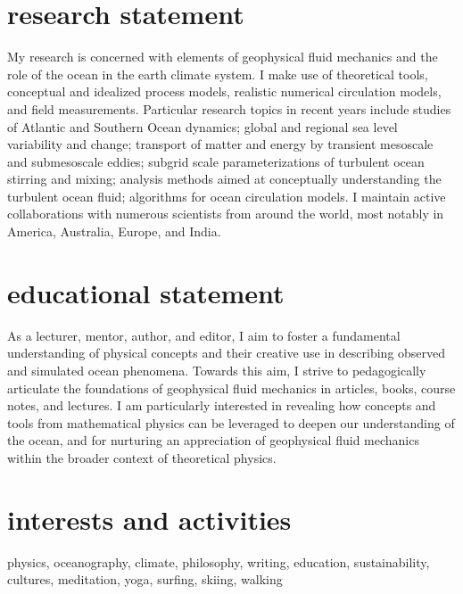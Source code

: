 \documentclass{article}
\begin{document}
\section*{\sc \color{Maroon}  research statement}
\vspace{-.3cm}
My research is concerned with elements of geophysical fluid mechanics and the role of the ocean in the earth climate system. I make use of theoretical tools, conceptual and idealized process models, realistic numerical circulation models, and field measurements.
Particular research topics in recent years include studies of  Atlantic and Southern Ocean dynamics; global and regional sea level variability and change;  transport of matter and energy by transient mesoscale and submesoscale eddies; subgrid scale parameterizations of turbulent ocean stirring and mixing; analysis methods aimed at conceptually understanding the turbulent ocean fluid; algorithms for ocean circulation models. I maintain active collaborations with numerous scientists from around the world, most notably in America, Australia, Europe, and India. 

\section*{\sc \color{Maroon} educational statement}
\vspace{-.3cm}
As a lecturer, mentor, author, and editor, I aim to foster a fundamental understanding of physical concepts and their creative use in describing observed and simulated ocean phenomena. Towards this aim, I strive to pedagogically articulate the foundations of geophysical fluid mechanics in articles, books, course notes, and lectures.  I am particularly interested in revealing how concepts and tools from mathematical physics can be leveraged to deepen our understanding of the ocean, and for nurturing an appreciation of geophysical fluid mechanics within the broader context of theoretical physics. 

\section*{\sc  \color{Maroon}  interests and activities}
\vspace{-.25cm}

physics, oceanography, climate, philosophy, writing, education, sustainability, cultures, meditation, yoga, surfing, skiing, walking
\end{document}

